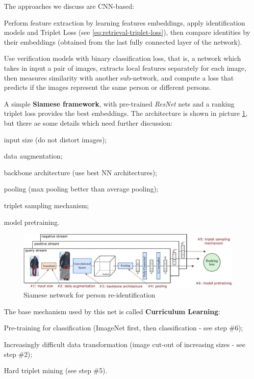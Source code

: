 The approaches we discuss are CNN-based:
\begin{myitem}
    \item Perform feature extraction by learning features embeddings, apply identification models and Triplet Loss (see \ref{eq:retrieval-triplet-loss}), then compare identities by their embeddings (obtained from the last fully connected layer of the network).
    \item Use verification models with binary classification loss, that is, a network which takes in input a pair of images, extracts local features separately for each image, then measures similarity with another sub-network, and compute a loss that predicts if the images represent the same person or different persons.
\end{myitem}
A simple \textbf{Siamese framework}, with pre-trained \textit{ResNet} nets and a ranking triplet loss provides the best embeddings. The architecture is shown in picture \ref{fig:siamese-net}, but there ae some details which need further discussion:
\begin{myenum}
    \item input size (do not distort images);
    \item data augmentation;
    \item backbone architecture (use best NN architectures);
    \item pooling (max pooling better than average pooling);
    \item triplet sampling mechanism;
    \item model pretraining.
\end{myenum}

\begin{figure}[h!]
    \centering
    \includegraphics[width=0.8\linewidth]{images/siamese-net}
    \caption[Siamese network for person re-identification]{Siamese network for person re-identification}
    \label{fig:siamese-net}
\end{figure}

The base mechanism used by this net is called \textbf{Curriculum Learning}:
\begin{myitem}
    \item Pre-training for classification (ImageNet first, then classification - see step \#6);
    \item Increasingly difficult data transformation (image cut-out of increasing sizes - see step
    \#2);
    \item Hard triplet mining (see step \#5).
\end{myitem}

